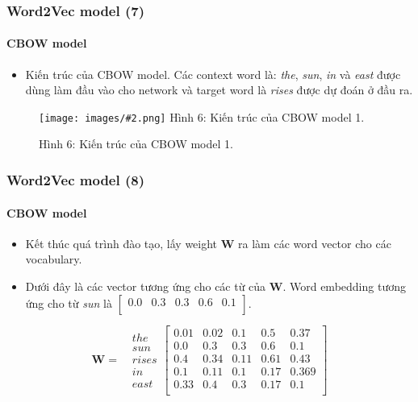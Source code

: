 \documentclass[aspectratio=169]{beamer}
\newcommand{\includeImage}[3]{
\begin{figure}[H]
    \centering
    \texttt{[image: images/\#2.png]}
    \def\temp{#3}\ifx\temp\empty\else\caption{#3}\fi
\end{figure}}
\begin{document}
\begin{frame}
    \frametitle{Word2Vec model (7)}
    \framesubtitle{CBOW model}
    \begin{itemize}
            \item Kiến trúc của CBOW model. Các context word là: \textsl{the}, \textsl{sun}, \textsl{in} và \textsl{east} được dùng làm đầu vào cho network và target word là \textsl{rises} được dự đoán ở đầu ra.
    \end{itemize}

    \includeImage{0.52}{06}{Hình 6: Kiến trúc của CBOW model 1.}
\end{frame}

\begin{frame}
    \frametitle{Word2Vec model (8)}
    \framesubtitle{CBOW model}
    \begin{itemize}
            \item Kết thúc quá trình đào tạo, lấy weight $\boldsymbol{W}$ ra làm các word vector cho các vocabulary.
            \item Dưới đây là các vector tương ứng cho các từ của $\boldsymbol{W}$. Word embedding tương ứng cho từ \textsl{sun} là $\begin{bmatrix} 0.0 & 0.3 & 0.3 & 0.6 & 0.1 \\ \end{bmatrix}$.
    \end{itemize}

    $$\boldsymbol{W} = \text{ } \begin{matrix} the \\ sun \\ rises \\ in \\ east \end{matrix} \begin{bmatrix} 0.01 & 0.02 & 0.1 & 0.5 & 0.37 \\ 0.0 & 0.3 & 0.3 & 0.6 & 0.1 \\ 0.4 & 0.34 & 0.11 & 0.61 & 0.43 \\ 0.1 & 0.11 & 0.1 & 0.17 & 0.369 \\ 0.33 & 0.4 & 0.3 & 0.17 & 0.1 \\ \end{bmatrix}$$
\end{frame}
\end{document}
